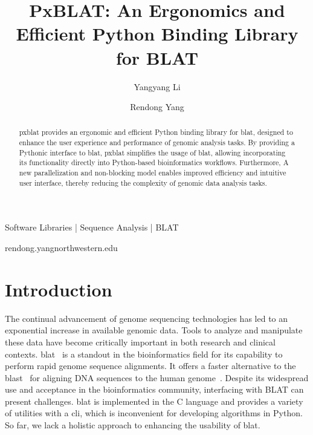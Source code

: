 
\title{PxBLAT: An Ergonomics and Efficient Python Binding Library for BLAT}

\author[1]{Yangyang Li}
\author[1,\Letter]{Rendong Yang }
\date{}

\maketitle


\begin{abstract}
	\gls{pxblat} provides an ergonomic and efficient Python binding library for \gls{blat}, designed to enhance the user experience and performance of genomic analysis tasks.
	By providing a Pythonic interface to \gls{blat}, \gls{pxblat} simplifies the usage of \gls{blat}, allowing incorporating its functionality directly into Python-based bioinformatics workflows.
	Furthermore, A new parallelization and non-blocking model enables improved efficiency and intuitive user interface, thereby reducing the complexity of genomic data analysis tasks.
\end{abstract}


\begin{keywords}
	Software Libraries |  Sequence Analysis | BLAT
\end{keywords}

\begin{corrauthor}
	rendong.yang\at northwestern.edu
\end{corrauthor}

\section*{Introduction}\label{sec:introduction}

The continual advancement of genome sequencing technologies has led to an exponential increase in available genomic data.
Tools to analyze and manipulate these data have become critically important in both research and clinical contexts.
\gls{blat}~\citep{kent2002blat} is a standout in the bioinformatics field for its capability to perform rapid genome sequence alignments.
It offers a faster alternative to the \gls{blast}~\citep{altschul1990basic} for aligning DNA sequences to the human genome~\citep{kent2002blat}.
Despite its widespread use and acceptance in the bioinformatics community, interfacing with BLAT can present challenges.
\gls{blat} is implemented in the C language and provides a variety of utilities with a \gls{cli}, which is inconvenient for developing algorithms in Python.
So far, we lack a holistic approach to enhancing the usability of \gls{blat}.

